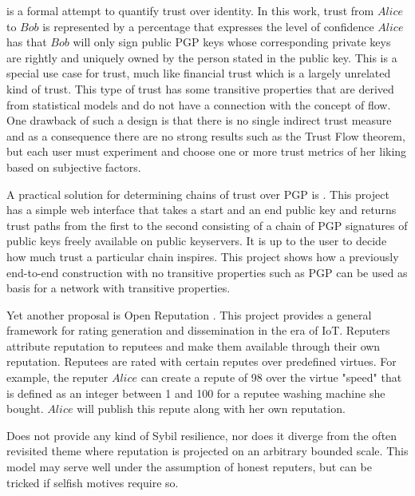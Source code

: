   \cite{wot} is a formal attempt to quantify trust over identity. In this work, trust from $Alice$ to $Bob$ is represented by
  a percentage that expresses the level of confidence $Alice$ has that $Bob$ will only sign public PGP keys whose
  corresponding private keys are rightly and uniquely owned by the person stated in the public key. This is a special use
  case for trust, much like financial trust which is a largely unrelated kind of trust. This type of trust has some
  transitive properties that are derived from statistical models and do not have a connection with the concept of flow. One
  drawback of such a design is that there is no single indirect trust measure and as a consequence there are no strong
  results such as the Trust Flow theorem, but each user must experiment and choose one or more trust metrics of her liking
  based on subjective factors.

  A practical solution for determining chains of trust over PGP is \cite{pathfinder}. This project has a simple web interface
  that takes a start and an end public key and returns trust paths from the first to the second consisting of a chain of PGP
  signatures of public keys freely available on public keyservers. It is up to the user to decide how much trust a particular
  chain inspires. This project shows how a previously end-to-end construction with no transitive properties such as PGP can
  be used as basis for a network with transitive properties.

  Yet another proposal is Open Reputation \cite{openrep}. This project provides a general framework for rating generation and
  dissemination in the era of IoT. Reputers attribute reputation to reputees and make them available through their own
  reputation. Reputees are rated with certain reputes over predefined virtues. For example, the reputer $Alice$ can create
  a repute of 98 over the virtue "speed" that is defined as an integer between 1 and 100 for a reputee washing machine she
  bought. $Alice$ will publish this repute along with her own reputation.

  \cite{openrep} Does not provide any kind of Sybil resilience, nor does it diverge from the often revisited theme where
  reputation is projected on an arbitrary bounded scale. This model may serve well under the assumption of honest reputers,
  but can be tricked if selfish motives require so.

